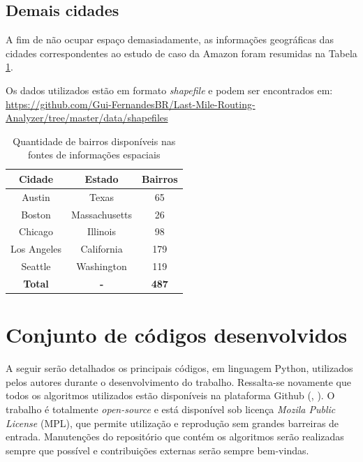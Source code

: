 \section{Demais cidades}

A fim de não ocupar espaço demasiadamente, as informações geográficas das cidades correspondentes ao estudo de caso da Amazon foram resumidas na Tabela \ref{tab:bairros-couting}. 

Os dados utilizados estão em formato \textit{shapefile} e podem ser encontrados em: \url{https://github.com/Gui-FernandesBR/Last-Mile-Routing-Analyzer/tree/master/data/shapefiles}

\begin{table}[H]
    \centering
    \caption{Quantidade de bairros disponíveis nas fontes de informações espaciais}
    \label{tab:bairros-couting}
    \begin{tabular}{|ccc|}
    \hline
    \multicolumn{1}{|c|}{\textbf{Cidade}} & \multicolumn{1}{c|}{\textbf{Estado}} & \multicolumn{1}{c|}{\textbf{Bairros}} \\ \hline
    Austin & Texas & 65 \\
    Boston & Massachusetts & 26 \\
    Chicago & Illinois & 98 \\
    Los Angeles & California & 179 \\
    Seattle & Washington & 119 \\ \hline
    \multicolumn{1}{|c}{\textbf{Total}} & \textbf{-} & \multicolumn{1}{c|}{\textbf{487}} \\ \hline
    \end{tabular}%
\end{table}

\chapter{Conjunto de códigos desenvolvidos}\label{sec:AppCodes}

A seguir serão detalhados os principais códigos, em linguagem Python, utilizados pelos autores durante o desenvolvimento do trabalho.
%
Ressalta-se novamente que todos os algoritmos utilizados estão disponíveis na plataforma Github (, \citeyear{guilherme_fernandes_alves_2022_6792977}).
%
O trabalho é totalmente \textit{open-source} e está disponível sob licença \textit{Mozila Public License} (MPL), que permite utilização e reprodução sem grandes barreiras de entrada.
%
Manutenções do repositório que contém os algoritmos serão realizadas sempre que possível e contribuições externas serão sempre bem-vindas.

